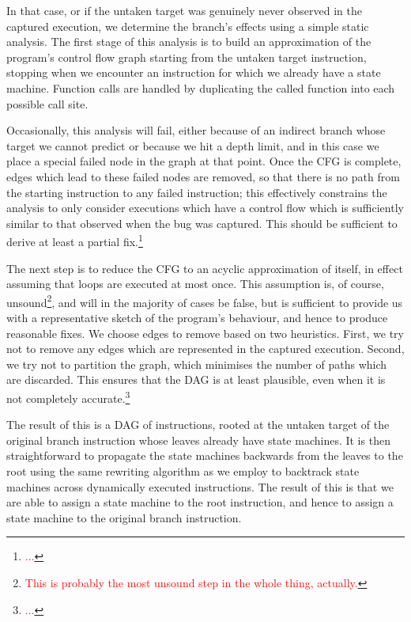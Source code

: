 \documentclass[10pt,twocolumn,preprint,natbib,authoryear]{sigplanconf}
\newcommand{\editorial}[1]{\textcolor{red}{\footnote{\textcolor{red}{#1}}}}
\begin{document}
In that case, or if the untaken target was genuinely never observed in
the captured execution, we determine the branch's effects using a
simple static analysis.  The first stage of this analysis is to build
an approximation of the program's control flow graph starting from the
untaken target instruction, stopping when we encounter an instruction
for which we already have a state machine.  Function calls are handled
by duplicating the called function into each possible call site.

Occasionally, this analysis will fail, either because of an indirect
branch whose target we cannot predict or because we hit a depth limit,
and in this case we place a special failed node in the graph at that
point.  Once the CFG is complete, edges which lead to these failed
nodes are removed, so that there is no path from the starting
instruction to any failed instruction; this effectively constrains the
analysis to only consider executions which have a control flow which
is sufficiently similar to that observed when the bug was captured.
This should be sufficient to derive at least a partial
fix.\editorial{...}

The next step is to reduce the CFG to an acyclic approximation of
itself, in effect assuming that loops are executed at most once.  This
assumption is, of course, unsound\editorial{This is probably the most
  unsound step in the whole thing, actually.}, and will in the
majority of cases be false, but is sufficient to provide us with a
representative sketch of the program's behaviour, and hence to produce
reasonable fixes.  We choose edges to remove based on two heuristics.
First, we try not to remove any edges which are represented in the
captured execution.  Second, we try not to partition the graph, which
minimises the number of paths which are discarded.  This ensures that
the DAG is at least plausible, even when it is not completely
accurate.\editorial{...}

The result of this is a DAG of instructions, rooted at the untaken
target of the original branch instruction whose leaves already have
state machines.  It is then straightforward to propagate the state
machines backwards from the leaves to the root using the same
rewriting algorithm as we employ to backtrack state machines across
dynamically executed instructions.  The result of this is that we are
able to assign a state machine to the root instruction, and hence to
assign a state machine to the original branch instruction.
\end{document}
